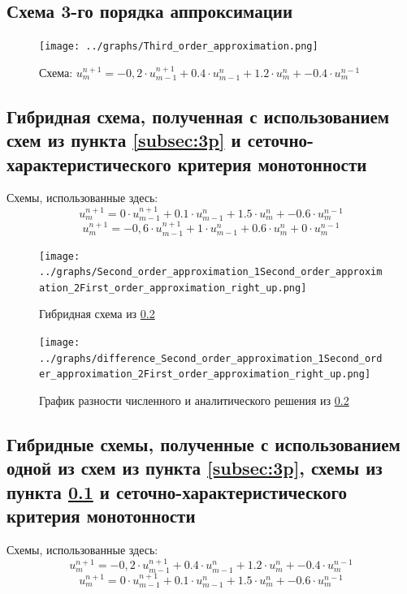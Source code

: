 \documentclass[a4paper, 12pt]{article} %
\begin{document}
\newpage
\subsection{Схема 3-го порядка аппроксимации}
\label{subsec:4p}
\begin{figure}[h!]
    \centering
    \texttt{[image: ../graphs/Third\_order\_approximation.png]}
    \caption{Схема: $u^{n+1}_{m} = -0,2 \cdot u^{n+1}_{m-1} + 0.4 \cdot u^{n}_{m-1} + 1.2 \cdot u^{n}_{m} + -0.4 \cdot u^{n-1}_{m}$ \\ }
    \label{fig:vac}
\end{figure}

\newpage
\subsection{Гибридная схема, полученная с использованием схем из пункта \ref{subsec:3p} и сеточно-характеристического критерия монотонности}
\label{subsec:5p}
Схемы, использованные здесь:
$$u^{n+1}_{m} = 0 \cdot u^{n+1}_{m-1} + 0.1 \cdot u^{n}_{m-1} + 1.5 \cdot u^{n}_{m} + -0.6 \cdot u^{n-1}_{m}$$
$$u^{n+1}_{m} = -0,6 \cdot u^{n+1}_{m-1} + 1 \cdot u^{n}_{m-1} + 0.6 \cdot u^{n}_{m} + 0 \cdot u^{n-1}_{m}$$
\begin{figure}[h!]
    \centering
    \texttt{[image: ../graphs/Second\_order\_approximation\_1Second\_order\_approximation\_2First\_order\_approximation\_right\_up.png]}
    \caption{Гибридная схема из \ref{subsec:5p} \\ }
    \label{fig:vac}
\end{figure}

\begin{figure}[h!]
    \centering
    \texttt{[image: ../graphs/difference\_Second\_order\_approximation\_1Second\_order\_approximation\_2First\_order\_approximation\_right\_up.png]}
    \caption{График разности численного и аналитического решения из \ref{subsec:5p} \\ }
    \label{fig:vac}
\end{figure}

\newpage
\subsection{Гибридные схемы, полученные с использованием одной из схем из пункта \ref{subsec:3p}, схемы из пункта \ref{subsec:4p} и сеточно-характеристического критерия монотонности}
\label{subsec:6p}
Схемы, использованные здесь:
$$u^{n+1}_{m} = -0,2 \cdot u^{n+1}_{m-1} + 0.4 \cdot u^{n}_{m-1} + 1.2 \cdot u^{n}_{m} + -0.4 \cdot u^{n-1}_{m}$$
$$u^{n+1}_{m} = 0 \cdot u^{n+1}_{m-1} + 0.1 \cdot u^{n}_{m-1} + 1.5 \cdot u^{n}_{m} + -0.6 \cdot u^{n-1}_{m}$$
\end{document}
